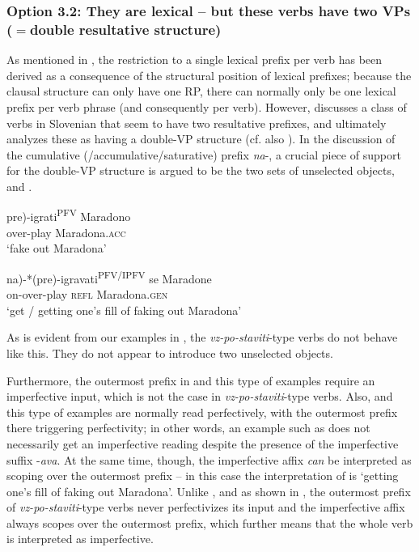 \documentclass[output=paper,colorlinks,citecolor=brown]{langscibook}
\begin{document}
  
 
\subsubsection{Option 3.2: They are lexical -- but these verbs have two VPs ($=$double resultative structure)}
As mentioned in , the restriction to a single lexical prefix per verb has been derived as a consequence of the structural position of lexical prefixes; because the clausal structure can only have one RP, there can normally only be one lexical prefix per verb phrase (and consequently per verb). However, \citet{zaucer2009vp} discusses a class of verbs in Slovenian that seem to have two resultative prefixes, and ultimately analyzes these as having a double-VP structure (cf. also \citealt{tatevosov2022}). In the discussion of the cumulative (/accumulative/saturative) prefix \textit{na}-, a crucial piece of support for the double-VP structure is argued to be the two sets of unselected objects,  and . 

\ea \gll \minsp{*(} pre)-igrati\textsuperscript{PFV} Maradono \label{ex:doublep}\\
{} over-play 	Maradona.\textsc{acc}\\
\glt `fake out Maradona’
\z

\ea \gll \minsp{*(} na)-*(pre)-igravati\textsuperscript{PFV/IPFV} se	Maradone \label{ex:maradona}\\
{} on-over-play 	\textsc{refl} 	Maradona.\textsc{gen}\\ 
\glt `get / getting one’s fill of faking out Maradona'
\z

\noindent As is evident from our examples in , the \textit{vz-po-staviti}-type verbs do not behave like this. They do not appear to introduce two unselected objects.

Furthermore, the outermost prefix in  and this type of examples require an imperfective input, which is not the case in \textit{vz-po-staviti}-type verbs. Also,  and this type of examples are normally read perfectively, with the outermost prefix there triggering perfectivity; in other words, an example such as  does not necessarily get an imperfective reading despite the presence of the imperfective suffix -\textit{ava}. At the same time, though, the imperfective affix \textit{can} be interpreted as scoping over the outermost prefix -- in this case the interpretation of  is `getting one’s fill of faking out Maradona'. Unlike , and as shown in , the outermost prefix of \textit{vz-po-staviti}-type verbs never perfectivizes its input and the imperfective affix always scopes over the outermost prefix, which further means that the whole verb is interpreted as imperfective.
\end{document}
